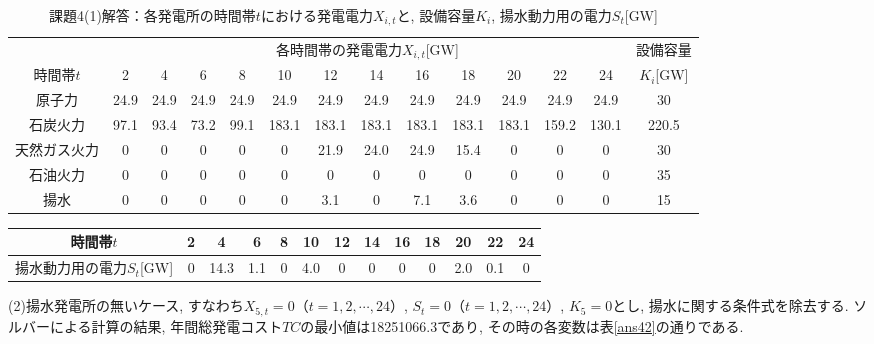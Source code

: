 \documentclass[]{jsarticle}
\begin{document}
        \begin{table}[htb]
          \begin{center}
            \caption{課題4(1)解答：各発電所の時間帯$t$における発電電力$X_{i,t}$と, 設備容量$K_i$, 揚水動力用の電力$S_t$[GW]}
            \begin{tabular}{|c||c|c|c|c|c|c|c|c|c|c|c|c||c|} \hline
              \multicolumn{1}{|c||}{} & \multicolumn{12}{|c||}{各時間帯の発電電力$X_{i,t}$[GW]} & \multicolumn{1}{|c|}{設備容量} \\ \cline{1-13}
              時間帯$t$ & 2 & 4 & 6 & 8 & 10 & 12 & 14 & 16 & 18 & 20 & 22 & 24 & $K_i$[GW]\\ \hline \hline
              原子力 &  24.9 & 24.9 & 24.9 & 24.9 & 24.9 & 24.9 & 24.9 & 24.9 & 24.9 & 24.9 & 24.9 & 24.9 & 30\\ \hline
              石炭火力 & 97.1 & 93.4 & 73.2 & 99.1 & 183.1 & 183.1 & 183.1 & 183.1 & 183.1 & 183.1 & 159.2 & 130.1 & 220.5\\ \hline
              天然ガス火力 & 0 & 0 & 0 & 0 & 0 & 21.9 & 24.0 & 24.9 & 15.4 & 0 & 0 & 0 & 30\\ \hline
              石油火力 & 0 & 0 & 0 & 0 & 0 & 0 & 0 & 0 & 0 & 0 & 0 & 0 & 35\\ \hline
              揚水 & 0 & 0 & 0 & 0 & 0 & 3.1 & 0 & 7.1 & 3.6 & 0 & 0 & 0 & 15\\ \hline
            \end{tabular}
            \label{ans41}
          \end{center}
        \end{table}
        \begin{table}
          \begin{center}
            \begin{tabular}{|c||c|c|c|c|c|c|c|c|c|c|c|c|} \hline
              時間帯$t$ & 2 & 4 & 6 & 8 & 10 & 12 & 14 & 16 & 18 & 20 & 22 & 24 \\ \hline \hline
              揚水動力用の電力$S_t$[GW] & 0 & 14.3 & 1.1 & 0 & 4.0 & 0 & 0 & 0 & 0 & 2.0 & 0.1 & 0  \\ \hline
            \end{tabular}
          \end{center}
        \end{table}

        (2)揚水発電所の無いケース, すなわち$X_{5,t} = 0（t = 1, 2, \cdots , 24）$, $S_t = 0（t = 1, 2, \cdots , 24）$, $K_5 = 0$とし, 揚水に関する条件式を除去する. ソルバーによる計算の結果, 年間総発電コスト$TC$の最小値は18251066.3であり, その時の各変数は表\ref{ans42}の通りである.
\end{document}
